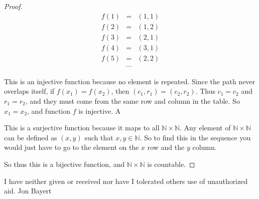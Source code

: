 \documentclass{article}
\begin{document}
\begin{proof}
    \begin{eqnarray*}
        f(1)&=&(1,1)\\
        f(2)&=&(1,2)\\
        f(3)&=&(2,1)\\
        f(4)&=&(3,1)\\
        f(5)&=&(2,2)\\
        &\cdots&
    \end{eqnarray*}
    
    This is an injective function because no element is repeated. Since the path never overlaps itself, if  $f(x_1) = f(x_2)$, then  $(c_1,r_1) = (c_2,r_2)$. Thus $c_1 = c_2$ and $r_1=r_2$, and they must come from the same row and column in the table. So $x_1 = x_2$, and function $f$ is injective.  A
    
    This is a surjective function because it maps to all $\mathbb{N}\times\mathbb{N}$. Any element of $\mathbb{N}\times\mathbb{N}$ can be defined as $(x,y)$ such that $x,y\in\mathbb{N}$. So to find this in the sequence you would just have to go to the element on the $x$ row and the $y$ column.
    
    So thus this is a bijective function, and $\mathbb{N}\times\mathbb{N}$ is countable.
\end{proof}



I have neither given or received nor have I tolerated others use of unauthorized aid. Jon Bayert
\end{document}

